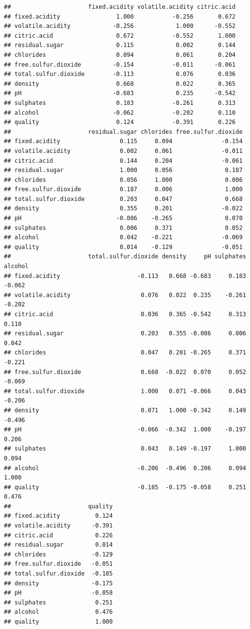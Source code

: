 \documentclass[]{article}
\begin{document}
\begin{verbatim}
##                      fixed.acidity volatile.acidity citric.acid
## fixed.acidity                1.000           -0.256       0.672
## volatile.acidity            -0.256            1.000      -0.552
## citric.acid                  0.672           -0.552       1.000
## residual.sugar               0.115            0.002       0.144
## chlorides                    0.094            0.061       0.204
## free.sulfur.dioxide         -0.154           -0.011      -0.061
## total.sulfur.dioxide        -0.113            0.076       0.036
## density                      0.668            0.022       0.365
## pH                          -0.683            0.235      -0.542
## sulphates                    0.183           -0.261       0.313
## alcohol                     -0.062           -0.202       0.110
## quality                      0.124           -0.391       0.226
##                      residual.sugar chlorides free.sulfur.dioxide
## fixed.acidity                 0.115     0.094              -0.154
## volatile.acidity              0.002     0.061              -0.011
## citric.acid                   0.144     0.204              -0.061
## residual.sugar                1.000     0.056               0.187
## chlorides                     0.056     1.000               0.006
## free.sulfur.dioxide           0.187     0.006               1.000
## total.sulfur.dioxide          0.203     0.047               0.668
## density                       0.355     0.201              -0.022
## pH                           -0.086    -0.265               0.070
## sulphates                     0.006     0.371               0.052
## alcohol                       0.042    -0.221              -0.069
## quality                       0.014    -0.129              -0.051
##                      total.sulfur.dioxide density     pH sulphates alcohol
## fixed.acidity                      -0.113   0.668 -0.683     0.183  -0.062
## volatile.acidity                    0.076   0.022  0.235    -0.261  -0.202
## citric.acid                         0.036   0.365 -0.542     0.313   0.110
## residual.sugar                      0.203   0.355 -0.086     0.006   0.042
## chlorides                           0.047   0.201 -0.265     0.371  -0.221
## free.sulfur.dioxide                 0.668  -0.022  0.070     0.052  -0.069
## total.sulfur.dioxide                1.000   0.071 -0.066     0.043  -0.206
## density                             0.071   1.000 -0.342     0.149  -0.496
## pH                                 -0.066  -0.342  1.000    -0.197   0.206
## sulphates                           0.043   0.149 -0.197     1.000   0.094
## alcohol                            -0.206  -0.496  0.206     0.094   1.000
## quality                            -0.185  -0.175 -0.058     0.251   0.476
##                      quality
## fixed.acidity          0.124
## volatile.acidity      -0.391
## citric.acid            0.226
## residual.sugar         0.014
## chlorides             -0.129
## free.sulfur.dioxide   -0.051
## total.sulfur.dioxide  -0.185
## density               -0.175
## pH                    -0.058
## sulphates              0.251
## alcohol                0.476
## quality                1.000
\end{verbatim}
\end{document}
